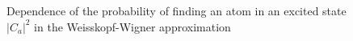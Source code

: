 \begin{figure}
\centering



\caption{Dependence of the probability of finding an atom in an excited
  state $\left|C_{a}\right|^2$ in the Weisskopf-Wigner approximation}
\label{fig:part1:vaickopf}
\end{figure}